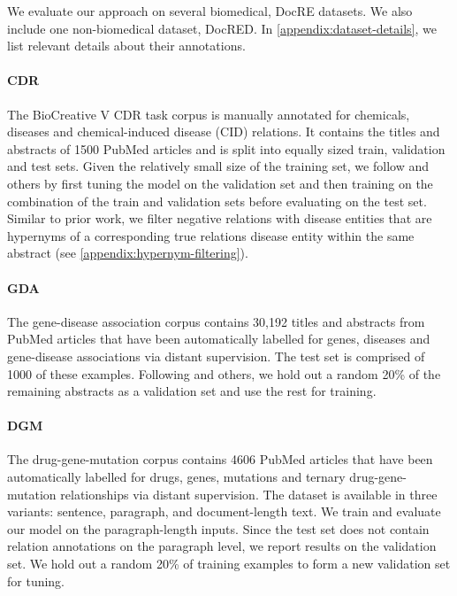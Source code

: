 \documentclass[11pt]{article}
\begin{document}
We evaluate our approach on several biomedical, DocRE datasets. We also include one non-biomedical dataset, DocRED. In \autoref{appendix:dataset-details}, we list relevant details about their annotations.

\paragraph{CDR \citep{li2016biocreative}}

The BioCreative V CDR task corpus is manually annotated for chemicals, diseases and chemical-induced disease (CID) relations. It contains the titles and abstracts of 1500 PubMed articles and is split into equally sized train, validation and test sets. Given the relatively small size of the training set, we follow \citet{christopoulou-etal-2019-connecting} and others by first tuning the model on the validation set and then training on the combination of the train and validation sets before evaluating on the test set. Similar to prior work, we filter negative relations with disease entities that are hypernyms of a corresponding true relations disease entity within the same abstract (see \autoref{appendix:hypernym-filtering}).

\paragraph{GDA \citep{renet2019}}

The gene-disease association corpus contains 30,192 titles and abstracts from PubMed articles that have been automatically labelled for genes, diseases and gene-disease associations via distant supervision. The test set is comprised of 1000 of these examples. Following \citet{christopoulou-etal-2019-connecting} and others, we hold out a random 20\% of the remaining abstracts as a validation set and use the rest for training.

\paragraph{DGM \citep{jia-etal-2019-document}}

The drug-gene-mutation corpus contains 4606 PubMed articles that have been automatically labelled for drugs, genes, mutations and ternary drug-gene-mutation relationships via distant supervision. The dataset is available in three variants: sentence, paragraph, and document-length text. We train and evaluate our model on the paragraph-length inputs. Since the test set does not contain relation annotations on the paragraph level, we report results on the validation set. We hold out a random 20\% of training examples to form a new validation set for tuning.
\end{document}
